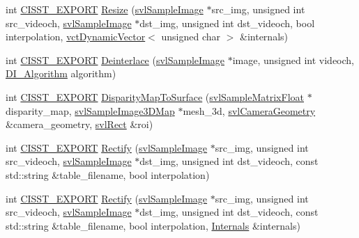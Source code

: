\begin{DoxyCompactItemize}
\item 
int \hyperlink{cmn_export_macros_8h_a99393e0c3ac434b2605235bbe20684f8}{C\+I\+S\+S\+T\+\_\+\+E\+X\+P\+O\+R\+T} \hyperlink{namespacesvl_image_processing_ab6fbb6e07771c385bb43ea816db591fa}{Resize} (\hyperlink{classsvl_sample_image}{svl\+Sample\+Image} $\ast$src\+\_\+img, unsigned int src\+\_\+videoch, \hyperlink{classsvl_sample_image}{svl\+Sample\+Image} $\ast$dst\+\_\+img, unsigned int dst\+\_\+videoch, bool interpolation, \hyperlink{classvct_dynamic_vector}{vct\+Dynamic\+Vector}$<$ unsigned char $>$ \&internals)
\item 
int \hyperlink{cmn_export_macros_8h_a99393e0c3ac434b2605235bbe20684f8}{C\+I\+S\+S\+T\+\_\+\+E\+X\+P\+O\+R\+T} \hyperlink{namespacesvl_image_processing_a189bad878f0eaa18d73001249f1d6fae}{Deinterlace} (\hyperlink{classsvl_sample_image}{svl\+Sample\+Image} $\ast$image, unsigned int videoch, \hyperlink{namespacesvl_image_processing_a52b75591f8aa2cf8a2b4ea843b2f864a}{D\+I\+\_\+\+Algorithm} algorithm)
\item 
int \hyperlink{cmn_export_macros_8h_a99393e0c3ac434b2605235bbe20684f8}{C\+I\+S\+S\+T\+\_\+\+E\+X\+P\+O\+R\+T} \hyperlink{namespacesvl_image_processing_a1deb4c78574fb77a765f68bb5d6e9d26}{Disparity\+Map\+To\+Surface} (\hyperlink{svl_sample_matrix_types_8h_ae74daf1a1fd34516e4d5f580b15a24b7}{svl\+Sample\+Matrix\+Float} $\ast$disparity\+\_\+map, \hyperlink{svl_sample_image_types_8h_a3e34d5c72fa0d2a079d24e0668358bfc}{svl\+Sample\+Image3\+D\+Map} $\ast$mesh\+\_\+3d, \hyperlink{classsvl_camera_geometry}{svl\+Camera\+Geometry} \&camera\+\_\+geometry, \hyperlink{structsvl_rect}{svl\+Rect} \&roi)
\item 
int \hyperlink{cmn_export_macros_8h_a99393e0c3ac434b2605235bbe20684f8}{C\+I\+S\+S\+T\+\_\+\+E\+X\+P\+O\+R\+T} \hyperlink{namespacesvl_image_processing_ad9c69ec6ba8c2bca78c92e6c526aea03}{Rectify} (\hyperlink{classsvl_sample_image}{svl\+Sample\+Image} $\ast$src\+\_\+img, unsigned int src\+\_\+videoch, \hyperlink{classsvl_sample_image}{svl\+Sample\+Image} $\ast$dst\+\_\+img, unsigned int dst\+\_\+videoch, const std\+::string \&table\+\_\+filename, bool interpolation)
\item 
int \hyperlink{cmn_export_macros_8h_a99393e0c3ac434b2605235bbe20684f8}{C\+I\+S\+S\+T\+\_\+\+E\+X\+P\+O\+R\+T} \hyperlink{namespacesvl_image_processing_afd12d68b2945a19f275a133bca4e6232}{Rectify} (\hyperlink{classsvl_sample_image}{svl\+Sample\+Image} $\ast$src\+\_\+img, unsigned int src\+\_\+videoch, \hyperlink{classsvl_sample_image}{svl\+Sample\+Image} $\ast$dst\+\_\+img, unsigned int dst\+\_\+videoch, const std\+::string \&table\+\_\+filename, bool interpolation, \hyperlink{classsvl_image_processing_1_1_internals}{Internals} \&internals)

\end{DoxyCompactItemize}
